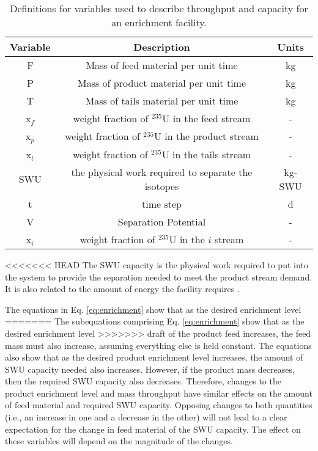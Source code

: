 \begin{table}[ht]
    \centering
    \caption{Definitions for variables used to describe throughput and 
    capacity for an enrichment facility.}
    \label{tab:enrichment_variables}
    \begin{tabular}{c c c}
        \hline
        Variable & Description & Units\\\hline
        F & Mass of feed material per unit time & kg\\
        P & Mass of product material per unit time & kg \\
        T & Mass of tails material per unit time & kg\\
        x$_f$ & weight fraction of $^{235}$U in the feed stream & -\\
        x$_p$ & weight fraction of $^{235}$U in the product stream & - \\
        x$_t$ & weight fraction of $^{235}$U in the tails stream & - \\
        \gls{SWU} & the physical work required to separate the isotopes & kg-SWU\\
        t & time step & d\\
        V & Separation Potential & - \\
        x$_i$ & weight fraction of $^{235}$U in the $i$ stream & - \\
        \hline
    \end{tabular}
\end{table}

<<<<<<< HEAD
\noindent The \acrfull{SWU} capacity 
is the physical work required to put into the system to provide the 
separation needed to meet the product stream demand. It is also related 
to the amount of energy the facility 
requires \cite{tsoulfanidis_nuclear_2013}. 

The equations in Eq. \ref{eq:enrichment} show that as the desired enrichment level 
=======
The subequations comprising Eq. \ref{eq:enrichment} show that as the desired 
enrichment level 
>>>>>>> draft
of the product feed increases, the feed mass must also increase, assuming everything 
else is held constant. The equations also show that as the desired 
product 
enrichment level increases, the amount of \gls{SWU} capacity needed also increases. 
However, if the product mass decreases, then the required \gls{SWU} capacity 
also decreases. Therefore, changes to the product enrichment level and mass 
throughput have similar effects on the amount of feed material and required 
\gls{SWU} capacity. Opposing changes to both quantities 
(i.e., an increase in one and a decrease in the other) will not lead to a clear 
expectation for the change in feed material of the \gls{SWU} capacity. 
The effect on these variables will depend on the magnitude of the changes.

